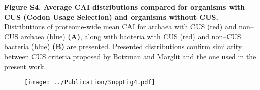 \documentclass{report}
\begin{document}
{\bf Figure S4. Average CAI distributions compared for organisms with CUS (Codon Usage Selection) and organisms without CUS.}
Distributions of proteome-wide mean CAI for archaea with CUS (red) and non--CUS archaea (blue) {\bf(A)}, along with bacteria with CUS (red) and non--CUS bacteria (blue) {\bf(B)} are presented. Presented distributions confirm similarity between CUS criteria proposed by Botzman and Marglit and the one used in the present work.

\begin{figure}[h!]
	\centering
	\texttt{[image: ../Publication/SuppFig4.pdf]}
\end{figure}
\end{document}
